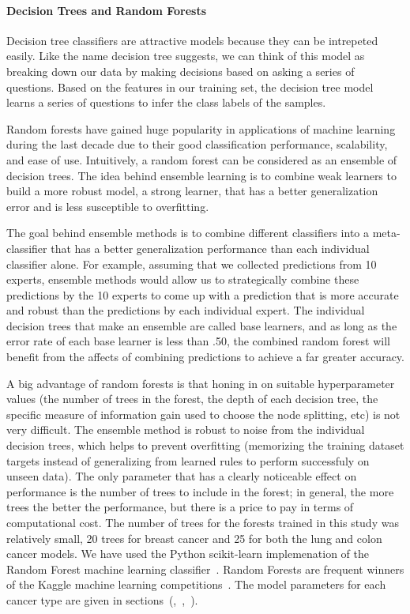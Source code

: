 \documentclass[10pt,letterpaper]{article}
\begin{document}
\paragraph{Decision Trees and Random Forests}
Decision tree classifiers are attractive models because they can be intrepeted easily. Like the name decision tree suggests, we can think of this model as breaking down our data by making decisions based on asking a series of questions.
Based on the features in our training set, the decision tree model learns a series of questions to infer the class labels of the samples. 

Random forests have gained huge popularity in applications of machine learning during the last decade due to their good classification performance, scalability, and ease of use. Intuitively, a random forest can be considered as an ensemble of decision trees. The idea behind ensemble learning is to combine weak learners to build a more robust model, a strong learner, that has a better generalization error and is less susceptible to overfitting. 

The goal behind ensemble methods is to combine different classifiers into a meta-classifier that has a better generalization performance than each individual classifier alone. For example, assuming that we collected predictions from 10 experts, ensemble methods would allow us to strategically combine these predictions by the 10 experts to come up with a prediction that is more accurate and robust than the predictions by each individual expert. The individual decision trees that make an ensemble are called base learners, and as long as the error rate of each base learner is less than .50, the combined random forest will benefit from the affects of combining predictions to achieve a far greater accuracy.







A big advantage of random forests is that honing in on suitable hyperparameter values (the number of trees in the forest, the depth of each decision tree, the specific measure of information gain used to choose the node splitting, etc) is not very difficult. The ensemble method is robust to noise from the individual decision trees, which helps to prevent overfitting (memorizing the training dataset targets instead of generalizing from learned rules to perform successfuly on unseen data). The only parameter that has a clearly noticeable effect on performance is the number of trees to include in the forest; in general, the more trees the better the performance, but there is a price to pay in terms of computational cost. The number of trees for the forests trained in this study was relatively small, 20 trees for breast cancer and 25 for both the lung and colon cancer models. We have used the Python scikit-learn implemenation of the Random Forest machine 
learning classifier~\cite{rf}.
Random Forests are frequent winners of the Kaggle machine learning competitions~\cite{kagglerf}.
The model parameters for each cancer type are given in
sections~(,~,~).
\end{document}
